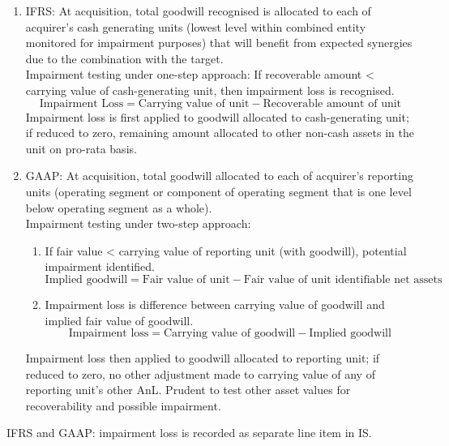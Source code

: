 \begin{method} 
\begin{enumerate}[label=\roman*.]
\setlength{\itemsep}{0pt}
\item IFRS: At acquisition, total goodwill recognised is allocated to each of acquirer’s cash generating units (lowest level within combined entity monitored for impairment purposes) that will benefit from expected synergies due to the combination with the target.\\
Impairment testing under one-step approach: If recoverable amount < carrying value of cash-generating unit, then impairment loss is recognised. 
\begin{equation}
\text{Impairment Loss} = \text{Carrying value of unit} - \text{Recoverable amount of unit} \nonumber
\end{equation}
Impairment loss is first applied to goodwill allocated to cash-generating unit; if reduced to zero, remaining amount allocated to other non-cash assets in the unit on pro-rata basis.
\item GAAP: At acquisition, total goodwill allocated to each of acquirer’s reporting units (operating segment or component of operating segment that is one level below operating segment as a whole).\\
Impairment testing under two-step approach: 
\begin{enumerate}[label=\arabic*.]
\setlength{\itemsep}{0pt}
\item If fair value < carrying value of reporting unit (with goodwill), potential impairment identified.
\begin{equation}
\text{Implied goodwill} = \text{Fair value of unit} - \text{Fair value of unit identifiable net assets} \nonumber
\end{equation}
\item Impairment loss is difference between carrying value of goodwill and implied fair value of goodwill.
\begin{equation}
\text{Impairment loss} = \text{Carrying value of goodwill} - \text{Implied goodwill} \nonumber
\end{equation}
\end{enumerate}
Impairment loss then applied to goodwill allocated to reporting unit; if reduced to zero, no other adjustment made to carrying value of any of reporting unit’s other AnL. Prudent to test other asset values for recoverability and possible impairment.
\end{enumerate}
IFRS and GAAP: impairment loss is recorded as separate line item in IS.
\end{method}

